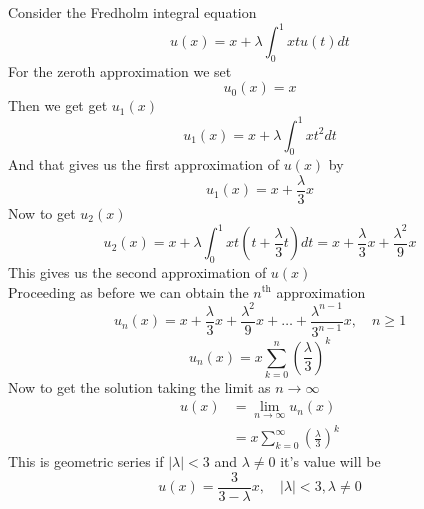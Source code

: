 \begin{example}
    Consider the Fredholm integral equation 
    \[
        u(x) = x + \lambda\int_{0}^{1} xt u(t)dt
    \]
    For the zeroth approximation we set 
    \[
    u_0(x) = x
    \]
    Then we get get $u_1(x)$
    \[
        u_1(x) = x + \lambda\int_{0}^{1} xt^2dt
    \]
    And that gives us the first approximation of $u(x)$ by
    \[
        u_1(x) = x + \frac{\lambda}{3}x
    \]
    Now to get $u_2(x)$
    \[
        u_2(x) = x + \lambda\int_{0}^{1} xt\left(t + \frac{\lambda}{3}t\right)dt = x +\frac{\lambda}{3} x +\frac{\lambda^2}{9} x
    \]
    This gives us the second approximation of $u(x)$
    \\
    Proceeding as before we can obtain the $n^{\text{th}}$ approximation
    \[
        u_n(x) = x +\frac{\lambda}{3} x +\frac{\lambda^2}{9} x + \dots + \frac{\lambda^{n-1}}{3^{n-1}} x , \quad n \geq 1
    \]
    \[
        u_n(x) = x\sum_{k=0}^{n} {\left(\frac{\lambda}{3}\right)}^{k}
    \]
    Now to get the solution taking the limit as $n \to \infty$
    \begin{align*}
        u(x) &= \lim_{n\to\infty} u_n(x)
        \\
        &= x\sum_{k=0}^{\infty} {\left(\frac{\lambda}{3}\right)}^{k}
    \end{align*}
    This is geometric series if $|\lambda| < 3$ and $\lambda \neq 0$ it's value will be 
    \[
    u(x) = \frac{3}{3-\lambda}x, \quad  |\lambda| < 3,\lambda \neq 0
    \]
\end{example}
